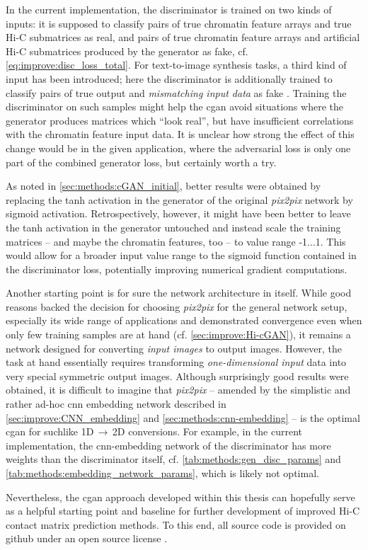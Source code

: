 In the current implementation, the discriminator is trained on two kinds of inputs:
it is supposed to classify pairs of true chromatin feature arrays and true Hi-C submatrices as real, 
and pairs of true chromatin feature arrays and artificial Hi-C submatrices produced by the generator as fake, cf. \cref{eq:improve:disc_loss_total}.
For text-to-image synthesis tasks, a third kind of input has been introduced; here the discriminator is additionally trained 
to classify pairs of true output and \emph{mismatching input data} as fake \cite{Reed2016}.
Training the discriminator on such samples might help the \acrshort{cgan} avoid situations 
where the generator produces matrices which ``look real'', 
but have insufficient correlations with the chromatin feature input data.
It is unclear how strong the effect of this change would be in the given application, 
where the adversarial loss is only one part of the combined generator loss, but certainly worth a try.

As noted in \cref{sec:methods:cGAN_initial}, better results were obtained by replacing the tanh activation in the generator 
of the original \emph{pix2pix} network by sigmoid activation.
Retrospectively, however, it might have been better to leave the tanh activation in the generator untouched
and instead scale the training matrices -- and maybe the chromatin features, too -- to value range -1...1.
This would allow for a broader input value range to the sigmoid function contained in the discriminator loss,
potentially improving numerical gradient computations.

Another starting point is for sure the network architecture in itself.
While good reasons backed the decision for choosing \emph{pix2pix} for the general network setup,
especially its wide range of applications and demonstrated convergence even when only few training 
samples are at hand \cite{Isola2017} (cf. \cref{sec:improve:Hi-cGAN}),
it remains a network designed for converting \emph{input images} to output images.
However, the task at hand essentially requires transforming \emph{one-dimensional input} data into very special symmetric output images.
Although surprisingly good results were obtained, it is difficult to imagine that \emph{pix2pix} -- amended by the simplistic and rather ad-hoc \acrshort{cnn} embedding network 
described in \cref{sec:improve:CNN_embedding} and \ref{sec:methods:cnn-embedding} -- is the optimal \acrshort{cgan} for suchlike 1D\,$\rightarrow$\,2D conversions.
For example, in the current implementation, the \acrshort{cnn}-embedding network of the discriminator has more weights than the discriminator itself, 
cf. \cref{tab:methods:gen_disc_params} and \ref{tab:methods:embedding_network_params}, which is likely not optimal.

Nevertheless, the \acrshort{cgan} approach developed within this thesis can hopefully serve as a helpful starting point and baseline
for further development of improved Hi-C contact matrix prediction methods.
To this end, all source code is provided on github under an open source license \cite{Krauth2021a, Krauth2021b}.
\clearpage
